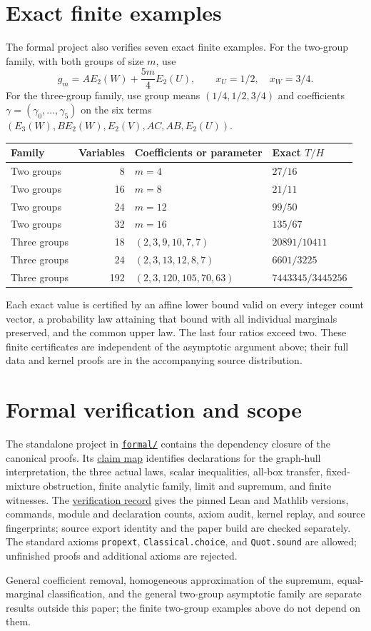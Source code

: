 \documentclass[11pt]{article}
\theoremstyle{remark}
\begin{document}
\section{Exact finite examples}\label{sec:witnesses}
The formal project also verifies seven exact finite examples. For the
two-group family, with both groups of size $m$, use
\[
 g_m=A E_2(W)+\frac{5m}{4}E_2(U),
 \qquad x_U=1/2,\quad x_W=3/4.
\]
For the three-group family, use group means $(1/4,1/2,3/4)$ and
coefficients $\gamma=(\gamma_0,\ldots,\gamma_5)$ on the six terms
$(E_3(W),B E_2(W),E_2(V),AC,AB,E_2(U))$.
\begin{center}
\begin{tabular}{lrll}
\toprule
Family & Variables & Coefficients or parameter & Exact $T/H$\\
\midrule
Two groups & 8 & $m=4$ & $27/16$\\
Two groups & 16 & $m=8$ & $21/11$\\
Two groups & 24 & $m=12$ & $99/50$\\
Two groups & 32 & $m=16$ & $135/67$\\
Three groups & 18 & $(2,3,9,10,7,7)$ & $20891/10411$\\
Three groups & 24 & $(2,3,13,12,8,7)$ & $6601/3225$\\
Three groups & 192 & $(2,3,120,105,70,63)$ & $7443345/3445256$\\
\bottomrule
\end{tabular}
\end{center}
Each exact value is certified by an affine lower bound valid on every
integer count vector, a probability law attaining that bound with all
individual marginals preserved, and the common upper law. The last
four ratios exceed two. These finite certificates are independent of
the asymptotic argument above; their full data and kernel proofs are
in the accompanying source distribution.

\section{Formal verification and scope}\label{sec:formal}
The standalone project in \href{formal/README.md}{\texttt{formal/}}
contains the dependency closure of the canonical proofs. Its
\href{formal/COVERAGE.md}{claim map} identifies declarations for the
graph-hull interpretation, the three actual laws, scalar inequalities,
all-box transfer, fixed-mixture obstruction, finite analytic family,
limit and supremum, and finite witnesses. The
\href{formal/VERIFICATION.md}{verification record} gives the pinned Lean
and Mathlib versions, commands, module and declaration counts, axiom
audit, kernel replay, and source fingerprints; source export identity
and the paper build are checked separately. The standard axioms
\texttt{propext}, \texttt{Classical.choice}, and \texttt{Quot.sound} are
allowed; unfinished proofs and additional axioms are rejected.

General coefficient removal, homogeneous approximation of the
supremum, equal-marginal classification, and the general two-group
asymptotic family are separate results outside this paper; the finite
two-group examples above do not depend on them.



\end{document}
